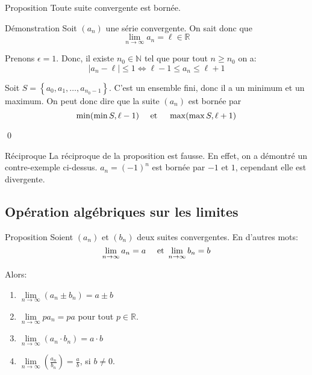 \documentclass[a4paper]{article}
\begin{document}
\begin{parag}{Proposition}
    Toute suite convergente est bornée.

    \begin{subparag}{Démonstration}
        Soit $\left(a_n\right)$ une série convergente. On sait donc que 
        \[\lim_{n \to \infty} a_n = \ell \in \mathbb{R}\]
        
        Prenons $\epsilon = 1$. Donc, il existe $n_0 \in \mathbb{N}$ tel que pour tout $n \geq n_0$ on a: 
        \[\left|a_n - \ell\right| \leq 1 \iff \ell - 1 \leq a_n \leq \ell + 1\]

        Soit $S = \left\{a_0, a_1, \ldots, a_{n_0 - 1}\right\}$. C'est un ensemble fini, donc il a un minimum et un maximum. On peut donc dire que la suite $\left(a_n\right)$ est bornée par 
        \[\min\left(\min S, \ell - 1\right) \mathspace \text{ et } \mathspace \max\left(\max S, \ell + 1\right)\]
        
        \qed
    \end{subparag}
    

    \begin{subparag}{Réciproque}
        La réciproque de la proposition est fausse. En effet, on a démontré un contre-exemple ci-dessus. $a_n = \left(-1\right)^n$ est bornée par $-1$ et $1$, cependant elle est divergente.  
    \end{subparag}
\end{parag}

\subsection{Opération algébriques sur les limites}
\begin{parag}{Proposition}
    Soient $\left(a_n\right)$ et $\left(b_n\right)$ deux suites convergentes. En d'autres mots:
    \[\lim_{n \to \infty} a_n = a \quad \text{ et } \lim_{n \to \infty} b_n = b\]
    
    Alors:
    \begin{enumerate}
        \item $\lim\limits_{n \to \infty} \left(a_n \pm b_n\right) = a \pm b$
        \item $\lim\limits_{n \to \infty} pa_n = pa$ pour tout $p \in \mathbb{R}$.
        \item $\lim\limits_{n \to \infty} \left(a_n\cdot b_n\right) = a\cdot b$
        \item $\lim\limits_{n \to \infty} \left(\frac{a_n}{b_n}\right) = \frac{a}{b}$, si $b \neq 0$.
    \end{enumerate}
\end{parag}
\end{document}

